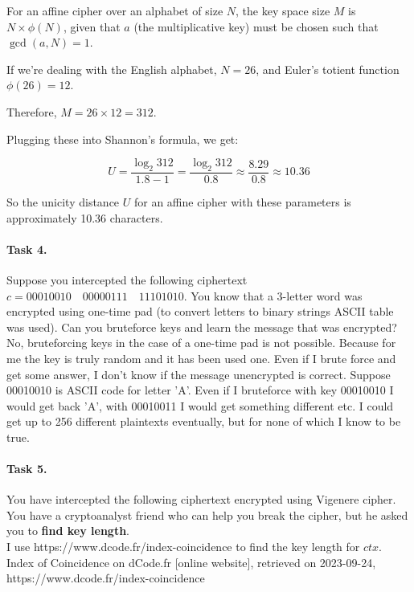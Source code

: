 \documentclass{article}
\begin{document}
For an affine cipher over an alphabet of size \( N \), the key space size \( M \) is \( N \times \phi(N) \), given that \( a \) (the multiplicative key) must be chosen such that \( \gcd(a, N) = 1 \).

If we're dealing with the English alphabet, \( N = 26 \), and Euler's totient function \( \phi(26) = 12 \).

Therefore, \( M = 26 \times 12 = 312 \).

Plugging these into Shannon's formula, we get:

\[
  U = \frac{\log_2 312}{1.8 - 1} = \frac{\log_2 312}{0.8} \approx \frac{8.29}{0.8} \approx 10.36
\]

So the unicity distance \( U \) for an affine cipher with these parameters is approximately 10.36 characters.



\paragraph{Task 4.} Suppose you intercepted the following ciphertext $c = 00010010 \quad 00000111 \quad 11101010$. You know that a
3-letter word was encrypted using one-time pad (to convert letters to binary strings ASCII table was used). Can you bruteforce keys and
learn the message that was encrypted?\\

No, bruteforcing keys in the case of a one-time pad is not possible. Because for me the key is truly random and it has been used one.
Even if I brute force and get some answer, I don't know if the message unencrypted is correct. Suppose 00010010 is ASCII code for letter
'A'. Even if I bruteforce with key 00010010 I would get back 'A', with 00010011 I would get something different etc. I could get up to 256
different plaintexts eventually, but for none of which I know to be true.



\paragraph{Task 5.}
You have intercepted the following ciphertext encrypted using Vigenere cipher. You have a cryptoanalyst friend who can help you break the cipher, but he asked you to \textbf{find key length}. \\

I use https://www.dcode.fr/index-coincidence to find the key length for $ctx$. Index of Coincidence on dCode.fr [online website], retrieved on 2023-09-24, https://www.dcode.fr/index-coincidence
\end{document}
